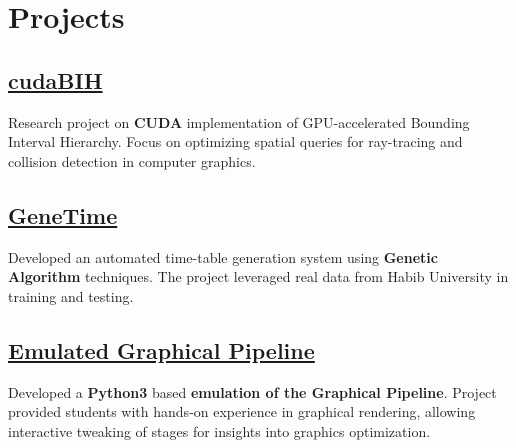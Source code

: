 \documentclass[]{resume}
\begin{document}
\begin{minipage}[t]{0.5\textwidth}


    \section{Projects}

    \subsection{\href{https://github.com/Qazalbash/cudaBIH}{\textbf{cudaBIH}}}
    Research project on \textbf{CUDA} implementation of GPU-accelerated Bounding Interval Hierarchy. Focus on optimizing spatial queries for ray-tracing and collision detection in computer graphics.

    \subsection{\href{https://github.com/Qazalbash/GeneTime}{\textbf{GeneTime}}}
    Developed an automated time-table generation system using \textbf{Genetic Algorithm} techniques. The project leveraged real data from Habib University in training and testing.


    \subsection{\href{https://github.com/Qazalbash/Emulated-Graphical-Pipeline}{
            \textbf{Emulated Graphical Pipeline}}}%
    Developed a \textbf{Python3} based \textbf{emulation of the Graphical Pipeline}. Project provided students with hands-on experience in graphical rendering, allowing interactive tweaking of stages for insights into graphics optimization.


\end{minipage}
\end{document}
